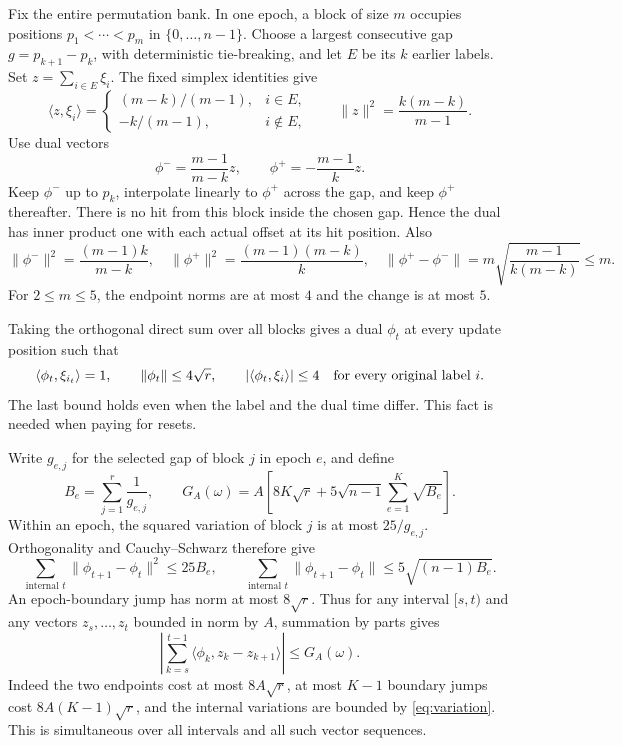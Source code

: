 \documentclass[11pt]{article}
\theoremstyle{remark}
\newcommand{\ip}[2]{\langle #1,#2\rangle}
\newcommand{\norm}[1]{\lVert #1\rVert}
\begin{document}
Fix the entire permutation bank. In one epoch, a block of size $m$
occupies positions $p_1<\cdots<p_m$ in $\{0,\ldots,n-1\}$. Choose
a largest consecutive gap $g=p_{k+1}-p_k$, with deterministic
tie-breaking, and let $E$ be its $k$ earlier labels. Set
$z=\sum_{i\in E}\xi_i$. The fixed simplex identities give
\[
 \ip z{\xi_i}=\begin{cases}(m-k)/(m-1),&i\in E,\\
                         -k/(m-1),&i\notin E,
             \end{cases}\qquad
 \norm z^2=\frac{k(m-k)}{m-1}.
\]
Use dual vectors
\begin{equation}\label{eq:dual-endpoints}
 \phi^-=\frac{m-1}{m-k}z,\qquad
 \phi^+=-\frac{m-1}{k}z.
\end{equation}
Keep $\phi^-$ up to $p_k$, interpolate linearly to $\phi^+$ across
the gap, and keep $\phi^+$ thereafter.
There is no hit from this block inside the chosen gap. Hence the dual
has inner product one with each actual offset at its hit position.
Also
\[
 \norm{\phi^-}^2=\frac{(m-1)k}{m-k},\quad
 \norm{\phi^+}^2=\frac{(m-1)(m-k)}k,\quad
 \norm{\phi^+-\phi^-}
   =m\sqrt{\frac{m-1}{k(m-k)}}\le m.
\]
For $2\le m\le5$, the endpoint norms are at most $4$ and the
change is at most $5$.

Taking the orthogonal direct sum over all blocks gives a dual
$\phi_t$ at every update position such that
\begin{equation}\label{eq:dual-bounds}
 \ip{\phi_t}{\xi_{i_t}}=1,\qquad
 \norm{\phi_t}\le4\sqrt r,\qquad
 |\ip{\phi_t}{\xi_i}|\le4\quad\hbox{for every original label }i.
\end{equation}
The last bound holds even when the label and the dual time differ.
This fact is needed when paying for resets.

Write $g_{e,j}$ for the selected gap of block $j$ in epoch $e$, and
define
\begin{equation}\label{eq:geometry}
 B_e=\sum_{j=1}^r\frac1{g_{e,j}},\qquad
 G_A(\omega)=A\left[8K\sqrt r+
             5\sqrt{n-1}\sum_{e=1}^K\sqrt{B_e}\right].
\end{equation}
Within an epoch, the squared variation of block $j$ is at most
$25/g_{e,j}$. Orthogonality and Cauchy--Schwarz therefore give
\begin{equation}\label{eq:variation}
 \sum_{\text{internal }t}\norm{\phi_{t+1}-\phi_t}^2\le25B_e,\qquad
 \sum_{\text{internal }t}\norm{\phi_{t+1}-\phi_t}
       \le5\sqrt{(n-1)B_e}.
\end{equation}
An epoch-boundary jump has norm at most $8\sqrt r$. Thus for any
interval $[s,t)$ and any vectors $z_s,\ldots,z_t$ bounded in norm by
$A$, summation by parts gives
\begin{equation}\label{eq:sbp}
 \left|\sum_{k=s}^{t-1}\ip{\phi_k}{z_k-z_{k+1}}\right|
 \le G_A(\omega).
\end{equation}
Indeed the two endpoints cost at most $8A\sqrt r$, at most $K-1$
boundary jumps cost $8A(K-1)\sqrt r$, and the internal variations
are bounded by \eqref{eq:variation}. This is simultaneous over all
intervals and all such vector sequences.
\end{document}
